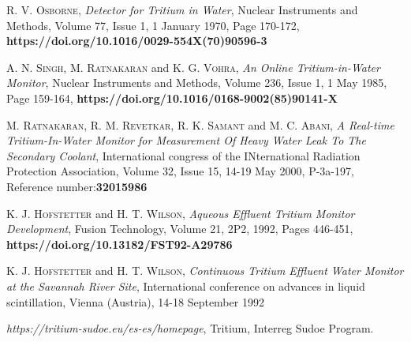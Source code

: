 \begin{thebibliography}{100}
 \textsc{R. V. Osborne},
\textit{Detector for Tritium in Water}, Nuclear Instruments and Methods, Volume 77, Issue 1, 1 January 1970, Page 170-172, \textbf{https://doi.org/10.1016/0029-554X(70)90596-3}

 \textsc{A. N. Singh}, \textsc{M. Ratnakaran} and \textsc{K. G. Vohra},
\textit{An Online Tritium-in-Water Monitor}, Nuclear Instruments and Methods, Volume 236, Issue 1, 1 May 1985, Page 159-164, \textbf{https://doi.org/10.1016/0168-9002(85)90141-X}

 \textsc{M. Ratnakaran}, \textsc{R. M. Revetkar}, \textsc{R. K. Samant} and \textsc{M. C. Abani},
\textit{A Real-time Tritium-In-Water Monitor for Measurement Of Heavy Water Leak To The Secondary Coolant}, International congress of the INternational Radiation Protection Association, Volume 32, Issue 15, 14-19 May 2000, P-3a-197, Reference number:\textbf{32015986}

 \textsc{K. J. Hofstetter} and \textsc{H. T. Wilson},
\textit{Aqueous Effluent Tritium Monitor Development}, Fusion Technology, Volume 21, 2P2, 1992, Pages 446-451, \textbf{https://doi.org/10.13182/FST92-A29786}

 \textsc{K. J. Hofstetter} and \textsc{H. T. Wilson},
\textit{Continuous Tritium Effluent Water Monitor at the Savannah River Site}, International conference on advances in liquid scintillation, Vienna (Austria), 14-18 September 1992

 \textit{https://tritium-sudoe.eu/es-es/homepage}, Tritium, Interreg Sudoe Program.
\end{thebibliography}